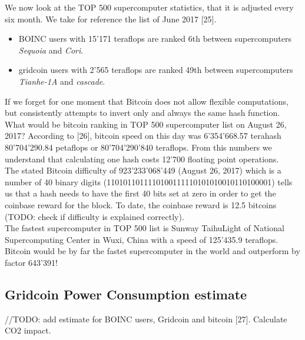 We now look at the TOP 500 supercomputer statistics, that it is adjusted every six month. We take for reference the list of June 2017 [25].

\begin{itemize}
    \item BOINC users with 15'171 teraflops are ranked 6th between supercomputers \textit{Sequoia} and \textit{Cori}.
	\item gridcoin users with 2'565 teraflops are ranked 49th between supercomputers \textit{Tianhe-1A} and \textit{cascade}.
\end{itemize}

If we forget for one moment that Bitcoin does not allow flexible computations, but consistently attempts to invert only and always the same hash function. What would be bitcoin ranking in TOP 500 supercomputer list on August 26, 2017? According to [26], bitcoin speed on this day was 6'354'668.57 terahash 80'704'290.84 petaflops or 80'704'290'840 teraflops. From this numbers we understand that calculating one hash costs 12'700 floating point operations. \\

The stated Bitcoin difficulty of 923'233'068'449 (August 26, 2017) which is a number of 40 binary digits (1101011011110100111110101010010110100001) tells us that a hash needs to have the first 40 bits set at zero in order to get the coinbase reward for the block. To date, the coinbase reward is 12.5 bitcoins (TODO: check if difficulty is explained correctly).\\

The fastest supercomputer in TOP 500 list is Sunway TaihuLight of National Supercomputing Center in Wuxi, China with a speed of 125'435.9 teraflops. Bitcoin would be by far the fastet supercomputer in the world and outperform by factor 643'391!

\subsection{Gridcoin Power Consumption estimate}

//TODO: add estimate for BOINC users, Gridcoin and bitcoin [27]. Calculate CO2 impact. 